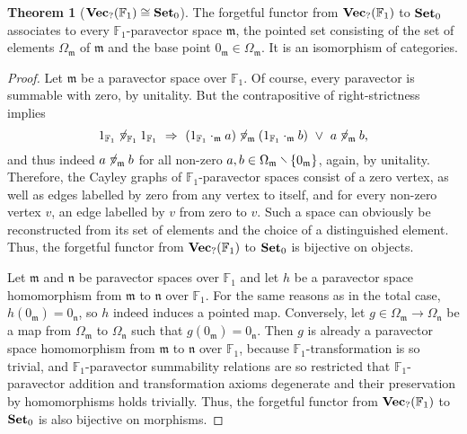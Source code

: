 \documentclass{article}
\theoremstyle{definition}
\newtheorem{theorem}[definition]{Theorem}
\newcommand{\impl}{~\Rightarrow~}
\newcommand{\disj}{~\lor~}
\newcommand{\ntridown}{\mathbin{\raisebox{.065em}{$\not$}\hspace{.19em}\raisebox{.02em}{\rotatebox[origin=c]{90}{$\triangleleft$}}}}
\newcommand{\ncomp}{\ntridown}
\newcommand{\diff}{\mathbin{\hspace{-.2em}\raisebox{.06em}{\rotatebox[origin=c]{-45}{$-$}\hspace{-.24em}}}}
\begin{document}
\begin{theorem}[\(\text{\bf Vec}_?(\mathbb{F}_1)\cong\text{\bf Set}_0\)]
The forgetful functor from \(\text{\bf Vec}_?(\mathbb{F}_1)\) to \(\text{\bf Set}_0\) associates to every \(\mathbb{F}_1\)-paravector space \(\mathfrak{m}\), the pointed set consisting of the set of elements \(\Omega_\mathfrak{m}\) of \(\mathfrak{m}\) and the base point \(0_\mathfrak{m}\in\Omega_\mathfrak{m}\). It is an isomorphism of categories.
\vspace{-6pt}
\begin{proof}
Let \(\mathfrak{m}\) be a paravector space over \(\mathbb{F}_1\). Of course, every paravector is summable with zero, by unitality. But the contrapositive of right-strictness implies \[1_{\mathbb{F}_1}\ncomp_{\mathbb{F}_1}1_{\mathbb{F}_1}\impl(1_{\mathbb{F}_1}\cdot_\mathfrak{m}a)\ncomp_\mathfrak{m}(1_{\mathbb{F}_1}\cdot_\mathfrak{m}b)\disj a\ncomp_\mathfrak{m}b\text{,}\] and thus indeed \(a\ncomp_\mathfrak{m}b\) for all non-zero \(a,b\in\Omega_\mathfrak{m}\diff\{0_\mathfrak{m}\}\), again, by unitality. Therefore, the Cayley graphs of \(\mathbb{F}_1\)-paravector spaces consist of a zero vertex, as well as edges labelled by zero from any vertex to itself, and for every non-zero vertex \(v\), an edge labelled by \(v\) from zero to \(v\). Such a space can obviously be reconstructed from its set of elements and the choice of a distinguished element. Thus, the forgetful functor from \(\text{\bf Vec}_?(\mathbb{F}_1)\) to \(\text{\bf Set}_0\) is bijective on objects.

Let \(\mathfrak{m}\) and \(\mathfrak{n}\) be paravector spaces over \(\mathbb{F}_1\) and let \(h\) be a paravector space homomorphism from \(\mathfrak{m}\) to \(\mathfrak{n}\) over \(\mathbb{F}_1\). For the same reasons as in the total case, \(h(0_\mathfrak{m})=0_\mathfrak{n}\), so \(h\) indeed induces a pointed map. Conversely, let \(g\in\Omega_\mathfrak{m}\to\Omega_\mathfrak{n}\) be a map from \(\Omega_\mathfrak{m}\) to \(\Omega_\mathfrak{n}\) such that \(g(0_\mathfrak{m})=0_\mathfrak{n}\). Then \(g\) is already a paravector space homomorphism from \(\mathfrak{m}\) to \(\mathfrak{n}\) over \(\mathbb{F}_1\), because \(\mathbb{F}_1\)-transformation is so trivial, and \(\mathbb{F}_1\)-paravector summability relations are so restricted that \(\mathbb{F}_1\)-paravector addition and transformation axioms degenerate and their preservation by homomorphisms holds trivially. Thus, the forgetful functor from \(\text{\bf Vec}_?(\mathbb{F}_1)\) to \(\text{\bf Set}_0\) is also bijective on morphisms.
\end{proof}
\end{theorem}
\end{document}
